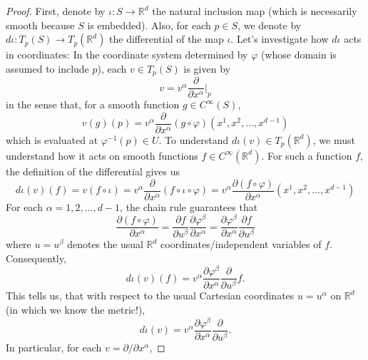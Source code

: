\documentclass{article}
\theoremstyle{definition}
\theoremstyle{theorem}
\begin{document}
\begin{proof}
First, denote by $\iota:S\to \mathbb{R}^d$ the natural inclusion map (which is necessarily smooth because $S$ is embedded). Also, for each $p\in S$, we denote by $d\iota: T_p(S)\to T_p(\mathbb{R}^d)$ the differential of the map $\iota$. Let's investigate how $d\iota$ acts in coordinates: In the coordinate system determined by $\varphi$ (whose domain is assumed to include $p$), each $v\in T_p(S)$ is given by
\begin{equation*}
v=v^{\alpha}\frac{\partial}{\partial x^{\alpha}}\big\vert_p
\end{equation*}
in the sense that, for a smooth function $g\in C^{\infty}(S)$,
\begin{equation*}
v(g)(p)=v^{\alpha}\frac{\partial}{\partial x^{\alpha}}(g\circ \varphi)(x^1,x^2,\dots,x^{d-1})
\end{equation*}
which is evaluated at $\varphi^{-1}(p)\in U$. 
To understand $d\iota(v)\in T_p(\mathbb{R}^d)$, we must understand how it acts on smooth functions $f\in C^{\infty}(\mathbb{R}^d)$. For such a function $f$, the definition of the differential gives us
\begin{equation*}
d\iota(v)(f)=v(f\circ\iota)=v^\alpha\frac{\partial}{\partial x^{\alpha}}(f\circ\iota\circ \varphi)=v^\alpha\frac{\partial (f\circ \varphi)}{\partial x^{\alpha}}(x^1,x^2,\dots,x^{d-1})
\end{equation*}
For each $\alpha=1,2,\dots,d-1$, the chain rule guarantees that
\begin{equation*}
\frac{\partial (f\circ \varphi)}{\partial x^\alpha}=\frac{\partial f}{\partial u^{\beta}}\frac{\partial \varphi^{\beta}}{\partial x^{\alpha}}=\frac{\partial \varphi^\beta}{\partial x^{\alpha}}\frac{\partial f}{\partial u^{\beta}}
\end{equation*}
where $u=u^\beta$ denotes the usual $\mathbb{R}^d$ coordinates/independent variables of $f$. Consequently,
\begin{equation*}
d\iota(v)(f)=v^\alpha \frac{\partial\varphi^{\beta}}{\partial x^{\alpha}}\frac{\partial}{\partial u^{\beta}} f.
\end{equation*}
This tells us, that with respect to the usual Cartesian coordinates $u=u^{\alpha}$ on $\mathbb{R}^d$ (in which we know the metric!), 
\begin{equation*}
d\iota(v)=v^\alpha\frac{\partial\varphi^{\beta}}{\partial x^{\alpha}}\frac{\partial}{\partial u^{\beta}}.
\end{equation*}
In particular, for each $v=\partial/\partial x^{\alpha}$,

\end{proof}
\end{document}
